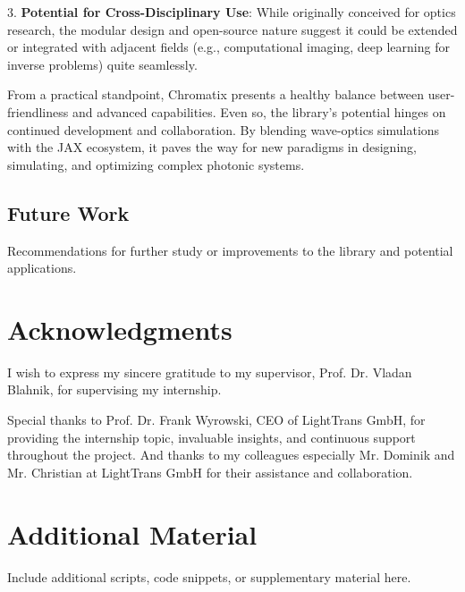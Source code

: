 \documentclass[a4paper,12pt]{report}
\begin{document}
\vspace{0.5em}
3. \textbf{Potential for Cross-Disciplinary Use}: While originally conceived for optics research, the modular design and open-source nature suggest it could be extended or integrated with adjacent fields (e.g., computational imaging, deep learning for inverse problems) quite seamlessly.

\vspace{0.5em}
From a practical standpoint, Chromatix presents a healthy balance between user-friendliness and advanced capabilities. Even so, the library’s potential hinges on continued development and collaboration. By blending wave-optics simulations with the JAX ecosystem, it paves the way for new paradigms in designing, simulating, and optimizing complex photonic systems.

\section{Future Work}
Recommendations for further study or improvements to the library and potential applications.

\chapter{Acknowledgments}
I wish to express my sincere gratitude to my supervisor, Prof. Dr. Vladan Blahnik, for supervising my internship. 

Special thanks to Prof. Dr. Frank Wyrowski, CEO of LightTrans GmbH, for providing the internship topic, invaluable insights, and continuous support throughout the project. And thanks to my colleagues especially  Mr. Dominik and Mr. Christian at LightTrans GmbH for their assistance and collaboration.






\appendix
\chapter{Additional Material}
Include additional scripts, code snippets, or supplementary material here.
\end{document}
